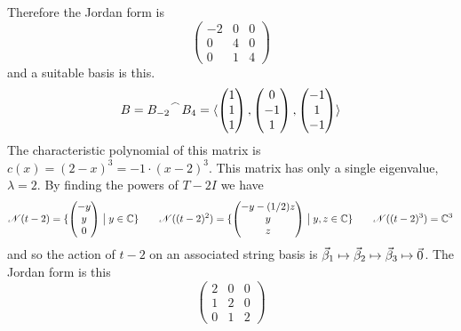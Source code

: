 \begin{exercises}
\begin{answer}
\begin{exparts}
            Therefore the Jordan form is  
            \begin{equation*}
              \begin{pmatrix}
                -2  &0  &0  \\
                 0  &4  &0  \\
                 0  &1  &4
              \end{pmatrix}
            \end{equation*}
            and a suitable basis is this.
            \begin{equation*}
              B=\cat{B_{-2}}{B_4}=
                \sequence{\colvec{1 \\ 1 \\ 1},
                          \colvec{0 \\ -1 \\ 1},
                          \colvec{-1 \\ 1 \\ -1}}
            \end{equation*}
        \partsitem The characteristic polynomial of this
            matrix is \( c(x)=(2-x)^3=-1\cdot (x-2)^3 \).
            This matrix has only a single eigenvalue, $\lambda=2$.
            By finding the powers of $T-2I$ we have  
            \begin{equation*}
              \mathscr{N}(t-2)=\mbox{$\{\begin{pmatrix} -y \\ y \\ 0 \end{pmatrix}
                                      \bigm| y\in\mathbb{C}\}$} 
              \qquad
              \mathscr{N}((t-2)^2)=\mbox{$\{\begin{pmatrix} -y-(1/2)z \\ y \\ z \end{pmatrix}
                                          \bigm| y,z\in\mathbb{C}\}$} 
              \qquad
              \mathscr{N}((t-2)^3)=\mathbb{C}^3
            \end{equation*}
            and so 
            the action of $t-2$ on an
            associated string basis is
            $\vec{\beta}_1\mapsto\vec{\beta}_2\mapsto
                   \vec{\beta}_3\mapsto\vec{0}$.
            The Jordan form is this
            \begin{equation*}
                  \begin{pmatrix}
                    2  &0  &0  \\
                    1  &2  &0  \\
                    0  &1  &2
                  \end{pmatrix}
            \end{equation*}

\end{exparts}
\end{answer}
\end{exercises}
